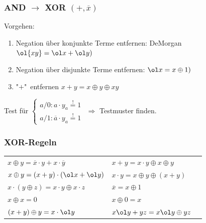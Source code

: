 \documentclass[6pt,a4paper]{scrartcl}
\begin{document}
\begin{multicols}{3}
	\subsubsection{AND $\rightarrow$ XOR $(+,\overline x)$}
	Vorgehen:
	\begin{enumerate}\itemsep-2pt
		\item Negation über konjunkte Terme entfernen: DeMorgan $\ol {xy} = \ol x + \ol y)$
		\item Negation über disjunkte Terme entfernen: $\ol x = x \oplus 1)$
		\item "$+$"\ entfernen $x + y = x \oplus y \oplus xy$\\
	\end{enumerate}
	Test für $\begin{cases} a/0: a\cdot y_a \stackrel{!}= 1\\
	a/1: \overline a\cdot y_a \stackrel{!}= 1
	\end{cases}$
	$\Rightarrow$ Testmuster finden.
	
	\subsubsection{XOR-Regeln}
	\begin{tabular}{l l l}
				$ x \oplus y = \overline x \cdot y + x \cdot \overline y$ & $x + y = x \cdot y \oplus x \oplus y$ \\
				$x \oplus y = (x+y) \cdot (\ol x + \ol y)$ & $x \cdot y = x \oplus y \oplus (x+y)$\\
				$ x \cdot (y \oplus z) = x \cdot y \oplus x \cdot z$ & $ \overline x = x \oplus 1$ \\
				$x \oplus x = 0$ & $x \oplus 0 = x$ \\
				$(x+y)\oplus y = x \cdot \ol y$ & $x \ol y + y z = x\ol y \oplus y z$\\
		\end{tabular}
		

\end{multicols}
\end{document}
